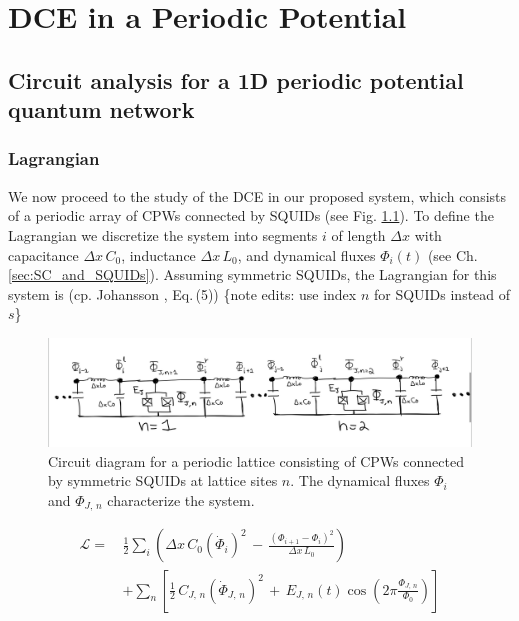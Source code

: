 \chapter{DCE in a Periodic Potential} \label{ch:system}


\section{Circuit analysis for a 1D periodic potential quantum network}\label{sec:circ_an}
%


\subsection{Lagrangian}

\noindent
We now proceed to the study of the DCE in our proposed system, which consists of a periodic array of CPWs connected by SQUIDs (see Fig. \ref{fig:circuit_diagram}). To define the Lagrangian we discretize the system into 
segments $i$ of length $\Delta x$ with capacitance $\Delta x \, C_0$, inductance $\Delta x \, L_0$, and dynamical fluxes $\Phi_i(t)$ (see Ch.\ref{sec:SC_and_SQUIDs}).
Assuming symmetric SQUIDs, the Lagrangian for this system is (cp. Johansson \cite{Johansson2010_DCE}, Eq.\,(5))
\color{red}\{note edits: use index $n$ for SQUIDs instead of $s$\} \color{black}
%
\begin{figure}[h]\label{fig:circuit_diagram}
    \centering
    \includegraphics[width=\textwidth, keepaspectratio]{figures/circuit_diagram.png}
    \caption{Circuit diagram for a periodic lattice consisting of CPWs connected by symmetric SQUIDs at lattice sites $n$. 
    The dynamical fluxes $\Phi_i$ and $\Phi_{J,\,n}$ characterize the system.}
\end{figure}
%
\begin{equation} \label{eq:lagn1}
\begin{split}
\mathcal{L} = \, & \frac{1}{2} \sum_i \left( \Delta x \, C_{0} \left(\dot{\Phi}_{i}\right)^{2} \, - \, 
\frac{\left(\Phi_{i+1}-\Phi_{i}\right)^{2}}{\Delta x \, L_{0}} \right)  \\[2mm]
& + \sum_n \left[ \frac{1}{2} \, C_{J,\,n} \left(\dot{\Phi}_{J,\,n} \right)^{2} \, + \, 
E_{J,\,n}(t) \cos\left(2\pi \frac{\Phi_{J,\,n}}{\Phi_0} \right) \right]
\end{split}
\end{equation}
